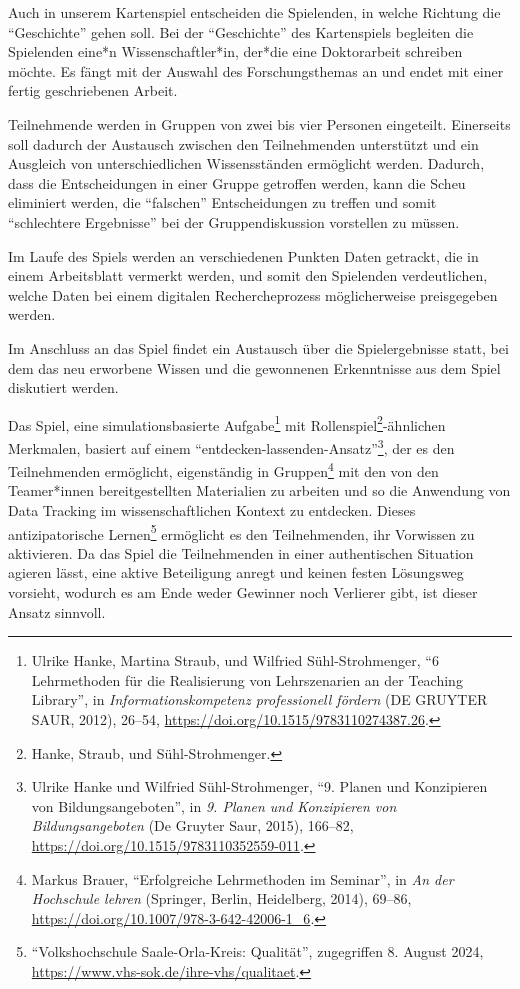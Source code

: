 \documentclass[a4paper,
fontsize=11pt,
oneside,
numbers=noperiodatend,
parskip=half-,
bibliography=totoc,
final
]{scrartcl}
\begin{document}
Auch in unserem Kartenspiel entscheiden die Spielenden, in welche
Richtung die \enquote{Geschichte} gehen soll. Bei der
\enquote{Geschichte} des Kartenspiels begleiten die Spielenden eine*n
Wissenschaftler*in, der*die eine Doktorarbeit schreiben möchte. Es fängt
mit der Auswahl des Forschungsthemas an und endet mit einer fertig
geschriebenen Arbeit.

Teilnehmende werden in Gruppen von zwei bis vier Personen eingeteilt.
Einerseits soll dadurch der Austausch zwischen den Teilnehmenden
unterstützt und ein Ausgleich von unterschiedlichen Wissensständen
ermöglicht werden. Dadurch, dass die Entscheidungen in einer Gruppe
getroffen werden, kann die Scheu eliminiert werden, die
\enquote{falschen} Entscheidungen zu treffen und somit
\enquote{schlechtere Ergebnisse} bei der Gruppendiskussion vorstellen zu
müssen.

Im Laufe des Spiels werden an verschiedenen Punkten Daten getrackt, die
in einem Arbeitsblatt vermerkt werden, und somit den Spielenden
verdeutlichen, welche Daten bei einem digitalen Rechercheprozess
möglicherweise preisgegeben werden.

Im Anschluss an das Spiel findet ein Austausch über die Spielergebnisse
statt, bei dem das neu erworbene Wissen und die gewonnenen Erkenntnisse
aus dem Spiel diskutiert werden.

Das Spiel, eine simulationsbasierte Aufgabe\footnote{Ulrike Hanke,
  Martina Straub, und Wilfried Sühl-Strohmenger, \enquote{6 Lehrmethoden
  für die Realisierung von Lehrszenarien an der Teaching Library}, in
  \emph{Informationskompetenz professionell fördern} (DE GRUYTER SAUR,
  2012), 26--54, \url{https://doi.org/10.1515/9783110274387.26}.} mit
Rollenspiel\footnote{Hanke, Straub, und Sühl-Strohmenger.}-ähnlichen
Merkmalen, basiert auf einem
\enquote{entdecken-lassenden-Ansatz}\footnote{Ulrike Hanke und Wilfried
  Sühl-Strohmenger, \enquote{9. Planen und Konzipieren von
  Bildungsangeboten}, in \emph{9. Planen und Konzipieren von
  Bildungsangeboten} (De Gruyter Saur, 2015), 166--82,
  \url{https://doi.org/10.1515/9783110352559-011}.}, der es den
Teilnehmenden ermöglicht, eigenständig in Gruppen\footnote{Markus
  Brauer, \enquote{Erfolgreiche Lehrmethoden im Seminar}, in \emph{An
  der Hochschule lehren} (Springer, Berlin, Heidelberg, 2014), 69--86,
  \url{https://doi.org/10.1007/978-3-642-42006-1_6}.} mit den von den
Teamer*innen bereitgestellten Materialien zu arbeiten und so die
Anwendung von Data Tracking im wissenschaftlichen Kontext zu entdecken.
Dieses antizipatorische Lernen\footnote{\enquote{Volkshochschule
  Saale-Orla-Kreis: Qualität}, zugegriffen 8. August 2024,
  \url{https://www.vhs-sok.de/ihre-vhs/qualitaet}.} ermöglicht es den
Teilnehmenden, ihr Vorwissen zu aktivieren. Da das Spiel die
Teilnehmenden in einer authentischen Situation agieren lässt, eine
aktive Beteiligung anregt und keinen festen Lösungsweg vorsieht, wodurch
es am Ende weder Gewinner noch Verlierer gibt, ist dieser Ansatz
sinnvoll.
\end{document}
